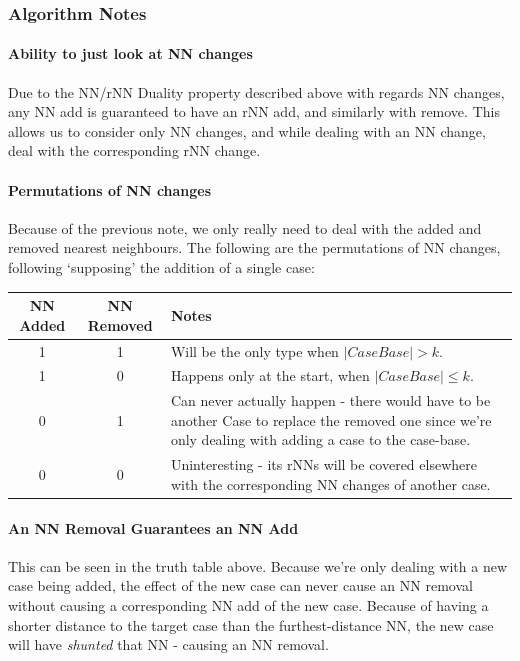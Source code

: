 \documentclass[a4paper,11pt]{report}
\begin{document}
\subsubsection{Algorithm Notes}
\paragraph{Ability to just look at NN changes}
Due to the NN/rNN Duality property described above with regards NN changes, any NN add is guaranteed to have an rNN add, and similarly with remove. This allows us to consider only NN changes, and while dealing with an NN change, deal with the corresponding rNN change.

\begin{samepage}
\paragraph{Permutations of NN changes}
Because of the previous note, we only really need to deal with the added and removed nearest neighbours. The following are the permutations of NN changes, following `supposing' the addition of a single case:

\vspace{10pt}

\begin{tabular}{ | c | c | p{280pt} |} \hline
	NN Added & NN Removed & Notes \\ \hline
	1 & 1 & Will be the only type when $\left|CaseBase\right|> k$. \\ \hline
	1 & 0 & Happens only at the start, when $\left|CaseBase\right|\leq k$. \\ \hline
	0 & 1 & Can never actually happen - there would have to be another Case to replace the removed one since we're only dealing with adding a case to the case-base. \\ \hline
	0 & 0 & Uninteresting - its rNNs will be covered elsewhere with the corresponding NN changes of another case. \\ \hline
\end{tabular}

\end{samepage}

\paragraph{An NN Removal Guarantees an NN Add}
This can be seen in the truth table above. Because we're only dealing with a new case being added, the effect of the new case can never cause an NN removal without causing a corresponding NN add of the new case. Because of having a shorter distance to the target case than the furthest-distance NN, the new case will have \emph{shunted} that NN - causing an NN removal.
\end{document}
